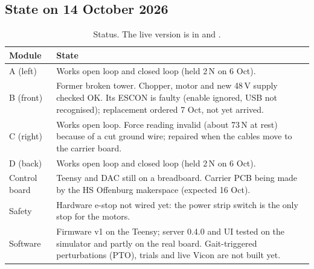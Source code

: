 \subsection{State on 14 October 2026}
\begin{table}[H]\centering
\begin{tabularx}{\linewidth}{lX}
\toprule
Module & State \\
\midrule
A (left)  & Works open loop and closed loop (held 2\,N on 6 Oct). \\
B (front) & Former broken tower. Chopper, motor and new 48\,V supply checked OK. Its ESCON is faulty
            (enable ignored, USB not recognised); replacement ordered 7 Oct, not yet arrived. \\
C (right) & Works open loop. Force reading invalid (about 73\,N at rest) because of a cut ground wire;
            repaired when the cables move to the carrier board. \\
D (back)  & Works open loop and closed loop (held 2\,N on 6 Oct). \\
\midrule
Control board & Teensy and DAC still on a breadboard. Carrier PCB being made by the HS Offenburg
            makerspace (expected 16 Oct). \\
Safety    & Hardware e-stop not wired yet: the power strip switch is the only stop for the motors. \\
Software  & Firmware v1 on the Teensy; server 0.4.0 and UI tested on the simulator and partly on the real board.
            Gait-triggered perturbations (PTO), trials and live Vicon are not built yet. \\
\bottomrule
\end{tabularx}
\caption{Status. The live version is in  and .}
\end{table}
